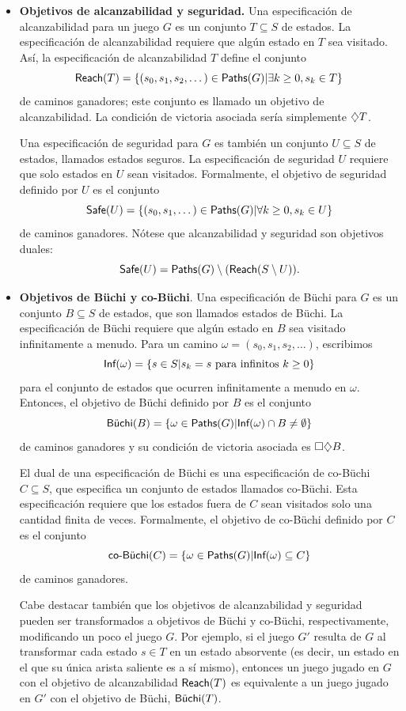 \begin{itemize}
	\item \textbf{Objetivos de alcanzabilidad y seguridad.} Una especificación de alcanzabilidad para un juego $G$ es un conjunto $T \subseteq S$ de estados. La especificación de alcanzabilidad requiere que algún estado en $T$ sea visitado. Así, la especificación de alcanzabilidad $T$ define el conjunto $$\Reach(T) = \{(s_0, s_1, s_2, \dots) \in \Paths(G) | \exists k \geq 0, s_k \in T\}$$ de caminos ganadores; este conjunto es llamado un objetivo de alcanzabilidad. La condición de victoria asociada sería simplemente $\alc T$.

	      Una especificación de seguridad para $G$ es también un conjunto $U \subseteq S$
	      de estados, llamados estados seguros. La especificación de seguridad $U$
	      requiere que solo estados en $U$ sean visitados. Formalmente, el objetivo de
	      seguridad definido por $U$ es el conjunto $$\Safe(U) = \{(s_0, s_1, \dots) \in
		      \Paths(G) | \forall k \geq 0, s_k \in U\}$$ de caminos ganadores. Nótese que
	      alcanzabilidad y seguridad son objetivos duales: $$\Safe(U) = \Paths(G)
		      \setminus (\Reach(S \setminus U)).$$

	\item \textbf{Objetivos de Büchi y co-Büchi}. Una especificación de Büchi para $G$ es un conjunto $B \subseteq S$ de estados, que son llamados estados de Büchi. La especificación de Büchi requiere que algún estado en $B$ sea visitado infinitamente a menudo. Para un camino $\omega = (s_0, s_1, s_2, \dots)$, escribimos $$\Inf(\omega) = \{s \in S | s_k = s \text{ para infinitos } k \geq 0\}$$ para el conjunto de estados que ocurren infinitamente a menudo en $\omega$. Entonces, el objetivo de Büchi definido por $B$ es el conjunto $$\Buchi(B) = \{\omega \in \Paths(G) | \Inf(\omega) \cap B \neq \emptyset\}$$ de caminos ganadores y su condición de victoria asociada es $\siempevent B$.

	      El dual de una especificación de Büchi es una especificación de co-Büchi \\ $C
		      \subseteq S$, que especifica un conjunto de estados llamados co-Büchi. Esta
	      especificación requiere que los estados fuera de $C$ sean visitados solo una
	      cantidad finita de veces. Formalmente, el objetivo de co-Büchi definido por $C$
	      es el conjunto $$\coBuchi(C) = \{\omega \in \Paths(G) | \Inf (\omega) \subseteq
		      C\}$$ de caminos ganadores.

	      Cabe destacar también que los objetivos de alcanzabilidad y seguridad pueden
	      ser transformados a objetivos de Büchi y co-Büchi, respectivamente, modificando
	      un poco el juego $G$. Por ejemplo, si el juego $G'$ resulta de $G$ al
	      transformar cada estado $s \in T$ en un estado absorvente (es decir, un estado
	      en el que su única arista saliente es a sí mismo), entonces un juego jugado en
	      $G$ con el objetivo de alcanzabilidad $\Reach(T)$ es equivalente a un juego
	      jugado en $G'$ con el objetivo de Büchi, $\Buchi(T)$.


\end{itemize}
